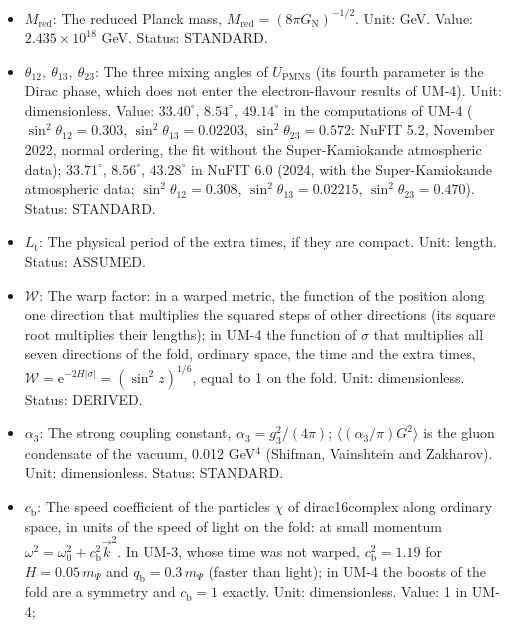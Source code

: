 \documentclass[
  10pt,
]{article}
\providecommand{\tightlist}{%
  \setlength{\itemsep}{0pt}\setlength{\parskip}{0pt}}
\begin{document}
\begin{itemize}
\tightlist
\item
  \(M_{\mathrm{red}}\): The reduced Planck mass,
  \(M_{\mathrm{red}} = (8\pi G_{\mathrm{N}})^{-1/2}\). Unit: GeV. Value:
  \(2.435\times10^{18}\) GeV. Status: STANDARD.
\item
  \(\theta_{12},\ \theta_{13},\ \theta_{23}\): The three mixing angles
  of \(U_{\mathrm{PMNS}}\) (its fourth parameter is the Dirac phase,
  which does not enter the electron-flavour results of UM-4). Unit:
  dimensionless. Value: \(33.40^\circ\), \(8.54^\circ\), \(49.14^\circ\)
  in the computations of UM-4 (\(\sin^2\theta_{12} = 0.303\),
  \(\sin^2\theta_{13} = 0.02203\), \(\sin^2\theta_{23} = 0.572\): NuFIT
  5.2, November 2022, normal ordering, the fit without the
  Super-Kamiokande atmospheric data); \(33.71^\circ\), \(8.56^\circ\),
  \(43.28^\circ\) in NuFIT 6.0 (2024, with the Super-Kamiokande
  atmospheric data; \(\sin^2\theta_{12} = 0.308\),
  \(\sin^2\theta_{13} = 0.02215\), \(\sin^2\theta_{23} = 0.470\)).
  Status: STANDARD.
\item
  \(L_{\mathrm{t}}\): The physical period of the extra times, if they
  are compact. Unit: length. Status: ASSUMED.
\item
  \(\mathcal{W}\): The warp factor: in a warped metric, the function of
  the position along one direction that multiplies the squared steps of
  other directions (its square root multiplies their lengths); in UM-4
  the function of \(\sigma\) that multiplies all seven directions of the
  fold, ordinary space, the time and the extra times,
  \(\mathcal{W} = \mathrm{e}^{-2H\lvert\sigma\rvert} = (\sin^2z)^{1/6}\),
  equal to 1 on the fold. Unit: dimensionless. Status: DERIVED.
\item
  \(\alpha_3\): The strong coupling constant,
  \(\alpha_3 = g_3^2/(4\pi)\); \(\langle(\alpha_3/\pi)G^2\rangle\) is
  the gluon condensate of the vacuum, 0.012 GeV\(^4\) (Shifman,
  Vainshtein and Zakharov). Unit: dimensionless. Status: STANDARD.
\item
  \(c_{\mathrm{b}}\): The speed coefficient of the particles \(\chi\) of
  dirac16complex along ordinary space, in units of the speed of light on
  the fold: at small momentum
  \(\omega^2 = \omega_0^2 + c_{\mathrm{b}}^2\vec k^2\). In UM-3, whose
  time was not warped, \(c_{\mathrm{b}}^2 = 1.19\) for
  \(H = 0.05\,m_\Psi\) and \(q_{\mathrm{b}} = 0.3\,m_\Psi\) (faster than
  light); in UM-4 the boosts of the fold are a symmetry and
  \(c_{\mathrm{b}} = 1\) exactly. Unit: dimensionless. Value: 1 in UM-4;

\end{itemize}
\end{document}

